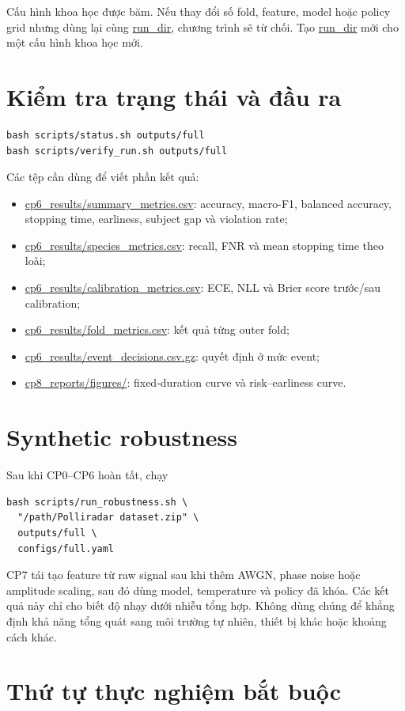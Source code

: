 \documentclass[12pt,draftclsnofoot,onecolumn]{IEEEtran}
\newcommand{\code}[1]{\url{#1}}
\begin{document}
Cấu hình khoa học được băm. Nếu thay đổi số fold, feature, model hoặc policy grid nhưng dùng lại cùng \code{run_dir}, chương trình sẽ từ chối. Tạo \code{run_dir} mới cho một cấu hình khoa học mới.

\section{Kiểm tra trạng thái và đầu ra}

\begin{lstlisting}
bash scripts/status.sh outputs/full
bash scripts/verify_run.sh outputs/full
\end{lstlisting}

Các tệp cần dùng để viết phần kết quả:
\begin{itemize}[leftmargin=*]
\item \code{cp6_results/summary_metrics.csv}: accuracy, macro-F1, balanced accuracy, stopping time, earliness, subject gap và violation rate;
\item \code{cp6_results/species_metrics.csv}: recall, FNR và mean stopping time theo loài;
\item \code{cp6_results/calibration_metrics.csv}: ECE, NLL và Brier score trước/sau calibration;
\item \code{cp6_results/fold_metrics.csv}: kết quả từng outer fold;
\item \code{cp6_results/event_decisions.csv.gz}: quyết định ở mức event;
\item \code{cp8_reports/figures/}: fixed-duration curve và risk--earliness curve.
\end{itemize}

\section{Synthetic robustness}

Sau khi CP0--CP6 hoàn tất, chạy
\begin{lstlisting}
bash scripts/run_robustness.sh \
  "/path/Polliradar dataset.zip" \
  outputs/full \
  configs/full.yaml
\end{lstlisting}

CP7 tái tạo feature từ raw signal sau khi thêm AWGN, phase noise hoặc amplitude scaling, sau đó dùng model, temperature và policy đã khóa. Các kết quả này chỉ cho biết độ nhạy dưới nhiễu tổng hợp. Không dùng chúng để khẳng định khả năng tổng quát sang môi trường tự nhiên, thiết bị khác hoặc khoảng cách khác.

\section{Thứ tự thực nghiệm bắt buộc}
\end{document}
